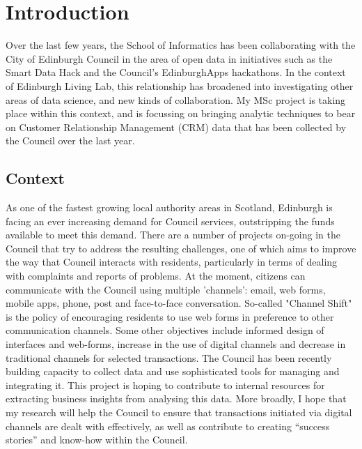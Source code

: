 
\chapter{Introduction}

Over the last few years, the School of Informatics has been collaborating with the City of Edinburgh Council in the area of open data in initiatives such as the Smart Data Hack and the Council's EdinburghApps hackathons. In the context of Edinburgh Living Lab, this relationship has broadened into investigating other areas of data science, and new kinds of collaboration. My MSc project is taking place within this context, and is focussing on bringing analytic techniques to bear on Customer Relationship Management (CRM) data that has been collected by the Council over the last year.

	\section{Context}

As one of the fastest growing local authority areas in Scotland, Edinburgh is facing an ever increasing demand for Council services, outstripping the funds available to meet this demand. There are a number of projects on-going in the Council that try to address the resulting challenges, one of which aims to improve the way that Council interacts with residents, particularly in terms of dealing with complaints and reports of problems. At the moment, citizens can communicate with the Council using multiple 'channels': email, web forms, mobile apps, phone, post and face-to-face conversation. So-called "Channel Shift" is the policy of encouraging residents to use web forms in preference to other communication channels. Some other objectives include informed design of interfaces and web-forms, increase in the use of digital channels and decrease in traditional channels for selected transactions. The Council has been recently building capacity to collect data and use sophisticated tools for managing and integrating it. This project is hoping to contribute to internal resources for extracting business insights from analysing this data. More broadly, I hope that my research will help the Council to ensure that transactions initiated via digital channels are dealt with effectively, as well as contribute to creating “success stories” and know-how within the Council.

